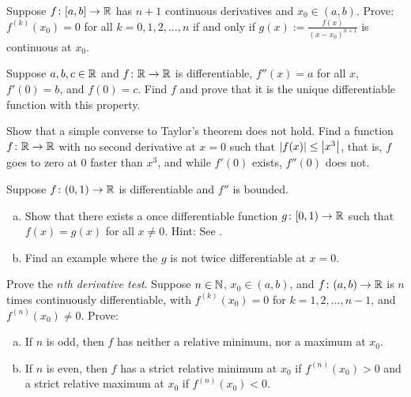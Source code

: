 \begin{exercise}
Suppose $f \colon [a,b] \to {\mathbb{R}}$ has $n+1$ continuous derivatives
and $x_0 \in (a,b)$.
Prove: $f^{(k)}(x_0) = 0$ for all $k = 0, 1, 2, \ldots, n$
if and only if $g(x) := \frac{f(x)}{{(x-x_0)}^{n+1}}$ is continuous at $x_0$.
\end{exercise}

\begin{exercise}
Suppose $a,b,c \in {\mathbb{R}}$ and $f \colon {\mathbb{R}} \to {\mathbb{R}}$ is differentiable,
$f''(x) = a$ for all $x$, $f'(0) = b$, and $f(0) = c$.  Find $f$ and prove that 
it is the unique differentiable function with this property.
\end{exercise}

\begin{exercise}[Challenging]
Show that a simple converse to Taylor's theorem does not hold.
Find a function $f \colon {\mathbb{R}} \to {\mathbb{R}}$ with no second derivative at $x=0$ such that
$\left\lvert {f(x)} \right\rvert \leq \left\lvert {x^3} \right\rvert$, that is, $f$ goes to zero at 0 faster than $x^3$, and
while $f'(0)$ exists, $f''(0)$ does not.
\end{exercise}

\begin{exercise} \label{exercise:extendboundedder2}
Suppose $f \colon (0,1) \to {\mathbb{R}}$ is differentiable and $f''$
is bounded.
\begin{enumerate}[a)]
\item
Show that there exists a once differentiable function $g \colon [0,1) \to {\mathbb{R}}$
such that $f(x) = g(x)$ for all $x \not= 0$.  Hint: 
See
.
\item
Find an example where the $g$ is not twice differentiable at $x=0$.
\end{enumerate}
\end{exercise}

\begin{exercise}
Prove the
\emph{$n$th derivative test}.
Suppose $n \in {\mathbb{N}}$,
$x_0 \in (a,b)$, and $f \colon (a,b) \to {\mathbb{R}}$ is $n$ times continuously
differentiable, with $f^{(k)}(x_0) = 0$ for $k=1,2,\ldots,n-1$, and
$f^{(n)}(x_0)
\not= 0$.
Prove:
\begin{enumerate}[a)]
\item
If $n$ is odd, then $f$ has neither a relative minimum,
nor a maximum at $x_0$.
\item
If $n$ is even, then $f$ has a strict relative minimum at $x_0$ if
$f^{(n)}(x_0) > 0$
and a strict relative maximum at $x_0$ if $f^{(n)}(x_0) < 0$.
\end{enumerate}
\end{exercise}

